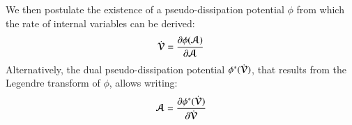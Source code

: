 We then postulate the existence of a pseudo-dissipation potential $\phi$ from which the rate of internal variables can be derived:
\begin{equation}
  \label{eq:pseudo-dissipation_potential}
  \dot{{\boldsymbol{\mathcal{V}}}}= \frac{\partial \phi({\boldsymbol{\mathcal{A}}})}{\partial {\boldsymbol{\mathcal{A}}}}
\end{equation}
Alternatively, the dual pseudo-dissipation potential $\phi^*(\dot{{\boldsymbol{\mathcal{V}}}})$, that results from the Legendre transform of $\phi$, allows writing:
\begin{equation}
  \label{eq:dual_form_kinetic}
  {\boldsymbol{\mathcal{A}}} = \frac{\partial \phi^*(\dot{{\boldsymbol{\mathcal{V}}}})}{\partial \dot{{\boldsymbol{\mathcal{V}}}}}
\end{equation}





